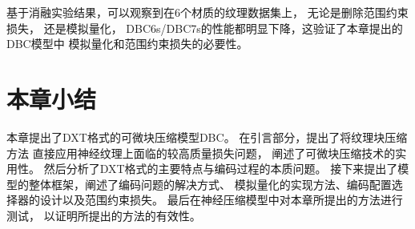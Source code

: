 基于消融实验结果，可以观察到在6个材质的纹理数据集上，
无论是删除范围约束损失，
还是模拟量化，
DBC6s/DBC7s的性能都明显下降，这验证了本章提出的DBC模型中
模拟量化和范围约束损失的必要性。



\section{本章小结}

本章提出了DXT格式的可微块压缩模型DBC。
在引言部分，提出了将纹理块压缩方法
直接应用神经纹理上面临的较高质量损失问题，
阐述了可微块压缩技术的实用性。
然后分析了DXT格式的主要特点与编码过程的本质问题。
接下来提出了模型的整体框架，阐述了编码问题的解决方式、
模拟量化的实现方法、编码配置选择器的设计以及范围约束损失。
最后在神经压缩模型中对本章所提出的方法进行测试，
以证明所提出的方法的有效性。








